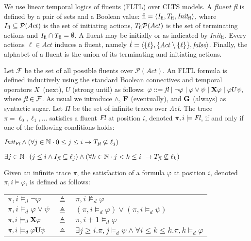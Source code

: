 
We use linear temporal logics of fluents (FLTL) over CLTS models. %
A \emph{fluent} \emph{fl} is defined by a pair of sets and a Boolean value: $\emph{\emph{fl}} = \langle I_{\emph{\emph{fl}}}, T_{\emph{\emph{fl}}}, \emph{Init}_{\emph{\emph{fl}}} \rangle$, where $I_{\emph{\emph{fl}}}\subseteq \mathcal{P}(Act)$ is the set of initiating actions, $T_{\emph{\emph{fl}}} \mathcal{P}(Act)$ is the set of terminating actions and $I_{\emph{\emph{fl}}}\cap T_{\emph{\emph{fl}}}=\emptyset$. 
A fluent may be initially \true or \false as indicated by \emph{Init}$_{\emph{\emph{fl}}}$. 
Every actions $\ell\in Act$ induces a fluent, namely $\dot{\ell}=\langle \{\ell\}, \{Act\setminus \{\ell\}\}, \emph{false}\rangle$. 
Finally, the alphabet of a fluent is the union of its terminating and initiating actions.

Let $\mathcal{F}$ be the set of all possible fluents over $\mathcal{P}(Act)$. 
An FLTL formula is defined inductively using the standard Boolean connectives and temporal operators $X$~(next), $U$ (strong until) as follows: 
$\varphi ::= \emph{fl} \mid \neg \varphi \mid \varphi \vee \psi \mid {\bf X} \varphi \mid \varphi U \psi,$
where $\emph{fl}\in\mathcal{F}$. 
As usual we introduce $\wedge$, ${\bf F}$ (eventually), and ${\bf G}$ (always) as syntactic sugar. 
Let $\Pi$ be the set of infinite traces over \emph{Act}.
The trace $\pi=\ell_0,\ell_1,\ldots$ satisfies a fluent $\emph{Fl}$ at position $i$, denoted $\pi,i \models \emph{Fl}$, if and only if one of the following conditions holds:
\begin{list}{-}%
	\item $\emph{Init}_{\emph{Fl}} \wedge (\forall j \in \mathbb{N} \cdot 0 \leq j \leq i \rightarrow T_{\emph{fl}} \not\subseteq \ell_j)$
	\item $\exists j \in \mathbb{N} \cdot (j \leq i \wedge I_{\emph{fl}} \subseteq \ell_j) \wedge (\forall k \in \mathbb{N} \cdot j < k \leq i \ \rightarrow T_{\emph{fl}} \not\subseteq \ell_k)$
\end{list}

Given an infinite trace $\pi$, the satisfaction of a formula $\varphi$ at position $i$, denoted $\pi,i\models\varphi$, is defined as follows:

\begin{tabular}{ l c l }
$\pi, i \models_d \neg \varphi$ & $\triangleq$ & $\pi, i \not\models_d \varphi$\\
$\pi, i \models_d \varphi \vee \psi$ & $\triangleq$ & $(\pi, i \models_d \varphi) \vee (\pi, i \models_d \psi)$\\
$\pi, i \models_d {\bf X} \varphi$ & $\triangleq$ & $\pi, i +1 \models_d \varphi$\\
$\pi, i \models_d \varphi {\bf U} \psi$ & $\triangleq$ & $\exists j \geq i . \pi,j \models_d \psi \wedge \forall i \leq k \le k. \pi, k \models_d \varphi$\\
\end{tabular}
  
